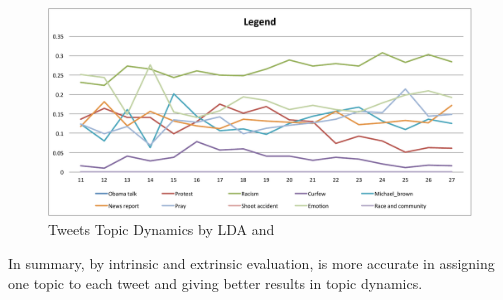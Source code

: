 \begin{figure}[htpb]
\centering
{}
\includegraphics[width=\linewidth]{figures/Legend.pdf}
\caption{Tweets Topic Dynamics by LDA and \stlda}\label{fig:tweets_topics}
\end{figure}

In summary, by intrinsic and extrinsic evaluation, \stlda is more accurate in assigning one topic to each tweet and giving better results in topic dynamics. %

